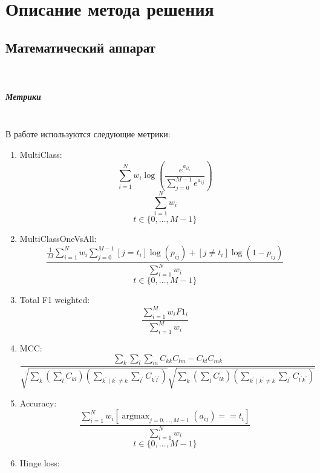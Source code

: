 \chapter{Описание метода решения}
\label{chap:def}
    \section{Математический аппарат} \\
    \paragraph{Метрики}
    \noindent \\
        
    \noindent
        В работе используются следующие метрики: \\
        \begin{enumerate}
            \item MultiClass:
             $$
            \sum_{i=1}^{N} w_{i} \log \left(\frac{e^{a_{i t_{i}}}}{\sum_{j=0}^{M-1} e^{a_{i j}}}\right)
            $$
            $$
            \sum_{i=1}^{N} w_{i}$$
            $$
            t \in\{0, \ldots, M-1\}
            $$
            \item MultiClassOneVsAll: 
            $$
            \frac{\frac{1}{M} \sum_{i=1}^{N} w_{i} \sum_{j=0}^{M-1}\left[j=t_{i}\right] \log \left(p_{i j}\right)+\left[j \neq t_{i}\right] \log \left(1-p_{i j}\right)}{\sum_{i=1}^{N} w_{i}}
            $$
            $$          
            t \in\{0, \ldots, M-1\}
            $$
            \item Total F1 weighted:
            $$ 
            \frac{\sum_{i=1}^{M} w_{i} F 1_{i}}{\sum_{i=1}^{M} w_{i}}
            $$
            \item MCC: 
            $$
            \frac{\sum_{k} \sum_{l} \sum_{m} C_{k k} C_{l m}-C_{k l} C_{m k}}{\sqrt{\sum_{k}\left(\sum_{l} C_{k l}\right)\left(\sum_{k^{\prime} \mid k^{\prime} \neq k} \sum_{l^{\prime}} C_{k^{\prime} l^{\prime}}\right)} \sqrt{\sum_{k}\left(\sum_{l} C_{l k}\right)\left(\sum_{k^{\prime} \mid k^{\prime} \neq k} \sum_{l^{\prime}} C_{l^{\prime} k^{\prime}}\right)}}
            $$
            \item Accuracy:
            $$
            \frac{\sum_{i=1}^{N} w_{i}\left[\operatorname{argmax}_{j=0, \ldots, M-1}\left(a_{i j}\right)==t_{i}\right]}{\sum_{i=1}^{N} w_{i}}
            $$
            $$
            t \in\{0, \ldots, M-1\}
            $$
            \item Hinge loss:

\end{enumerate}
